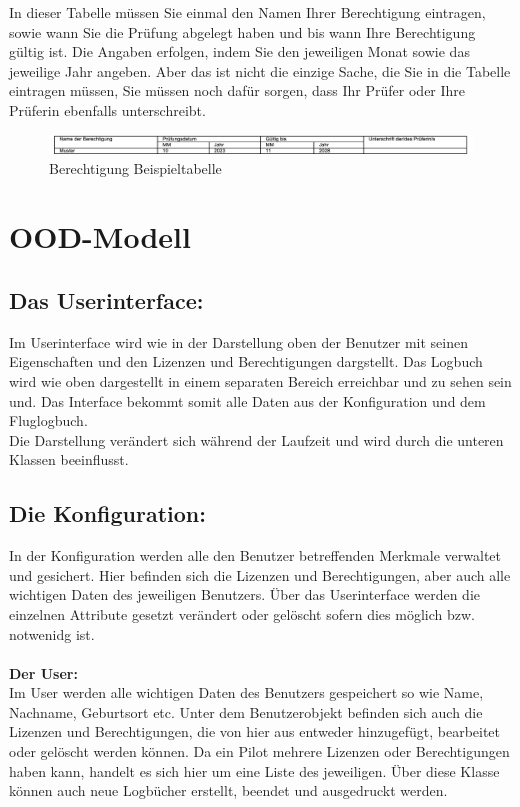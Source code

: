 \documentclass[a4paper]{article} %
\begin{document}
    \pagebreak
    
    \noindent In dieser Tabelle müssen Sie einmal den Namen Ihrer Berechtigung eintragen, sowie wann Sie die Prüfung abgelegt haben und bis wann Ihre Berechtigung gültig ist. Die Angaben erfolgen, indem Sie den jeweiligen Monat sowie das jeweilige Jahr angeben. Aber das ist nicht die einzige Sache, die Sie in die Tabelle eintragen müssen, Sie müssen noch dafür sorgen, dass Ihr Prüfer oder Ihre Prüferin ebenfalls unterschreibt.\\
    
    \begin{figure}[h!]
        \centering
        \includegraphics[width=17cm]{Berechtigung_Beispiel.png}
        \caption{Berechtigung Beispieltabelle}
        \label{fig:my_label}
    \end{figure}
    
    \section{OOD-Modell}
    \subsection{Das Userinterface:}
    Im Userinterface wird wie in der Darstellung oben der Benutzer mit seinen Eigenschaften und den Lizenzen und Berechtigungen dargstellt. Das Logbuch wird wie oben dargestellt in einem separaten Bereich erreichbar und zu sehen sein und. Das Interface bekommt somit alle Daten aus der Konfiguration und dem Fluglogbuch.\\
    Die Darstellung verändert sich während der Laufzeit und wird durch die unteren Klassen beeinflusst.\\
    \subsection{Die Konfiguration:}
    In der Konfiguration werden alle den Benutzer betreffenden Merkmale verwaltet und gesichert. Hier befinden sich die Lizenzen und Berechtigungen, aber auch alle wichtigen Daten des jeweiligen Benutzers. Über das Userinterface werden die einzelnen Attribute gesetzt verändert oder gelöscht sofern dies möglich bzw. notwenidg ist. \\
    \\
    \noindent \textbf{Der User:}\\
    Im User werden alle wichtigen Daten des Benutzers gespeichert so wie Name, Nachname, Geburtsort etc. Unter dem Benutzerobjekt befinden sich auch die Lizenzen und Berechtigungen, die von hier aus entweder hinzugefügt, bearbeitet oder gelöscht werden können. Da ein Pilot mehrere Lizenzen oder Berechtigungen haben kann, handelt es sich hier um eine Liste des jeweiligen. Über diese Klasse können auch neue Logbücher erstellt, beendet und ausgedruckt werden.
\end{document}
